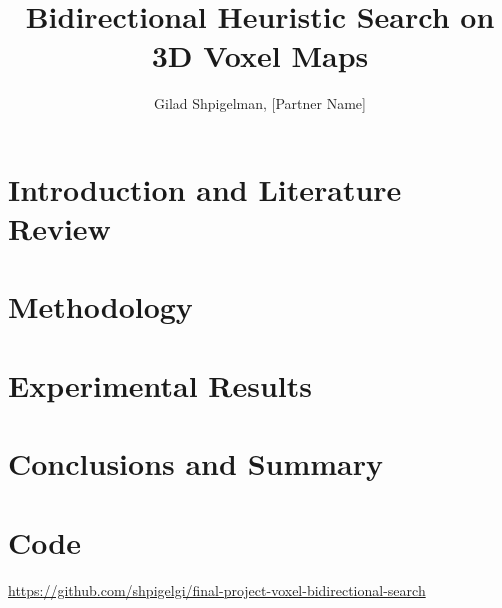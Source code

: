 \documentclass[letterpaper]{article} %
\title{Bidirectional Heuristic Search on 3D Voxel Maps}
\author{
    Gilad Shpigelman,
    [Partner Name]
}
\begin{document}
\maketitle

\begin{abstract}
\end{abstract}

\section{Introduction and Literature Review}

\section{Methodology}

\section{Experimental Results}

\section{Conclusions and Summary}

\section{Code}
\url{https://github.com/shpigelgi/final-project-voxel-bidirectional-search}

% 
\end{document}

